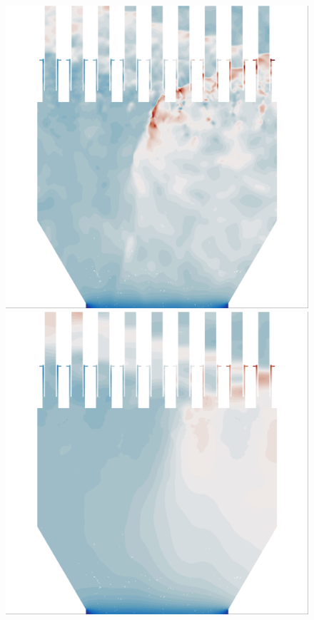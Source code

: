 \begin{figure}
	\begin{minipage}{0.45\linewidth}
		\includegraphics[width=0.99\linewidth,trim={0.5em 0.5em 0.5cm 0.5em},clip]{Chapters/HPROMResults/Images/nineElem/unsampled/fom/fig_z_Static_Pressure_218900.png}
	\end{minipage}
	\begin{minipage}{0.45\linewidth}
		\includegraphics[width=0.99\linewidth,trim={0.5em 0.5em 0.5cm 0.5em},clip]{Chapters/HPROMResults/Images/nineElem/unsampled/k20/samp100p/UnsteadyFieldResults/Images/fig_z_Static_Pressure_4378.png}
	\end{minipage}


\end{figure}
